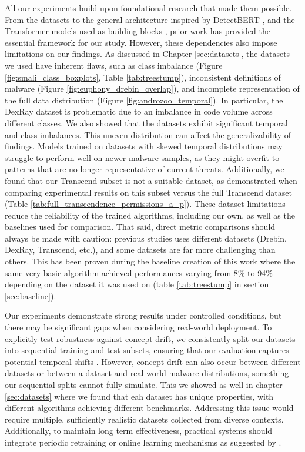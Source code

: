 All our experiments build upon foundational research that made them possible.
From the datasets \cite{drebin, transcend, dexray} to the general architecture inspired by 
DetectBERT \cite{detectbert}, and the Transformer models used as building blocks 
\cite{modernbert, bigbird, longformer}, prior work has provided the essential framework for our study.
However, these dependencies also impose limitations on our findings.
As discussed in Chapter \ref{sec:datasets}, the datasets we used have inherent flaws, 
such as class imbalance (Figure \ref{fig:smali_class_boxplots}, Table \ref{tab:treestump}), 
inconsistent definitions of malware (Figure \ref{fig:euphony_drebin_overlap}), 
and incomplete representation of the full data distribution (Figure \ref{fig:androzoo_temporal}).
In particular, the DexRay dataset \cite{dexray} is problematic due to an imbalance in code volume across different classes.
We also showed that the datasets exhibit significant temporal and class imbalances. 
This uneven distribution can affect the generalizability of findings. 
Models trained on datasets with skewed temporal distributions may struggle to perform well on newer malware samples, 
as they might overfit to patterns that are no longer representative of current threats. 
Additionally, we found that our Transcend subset is not a suitable dataset, 
as demonstrated when comparing experimental results on this subset versus the full Transcend dataset (Table \ref{tab:full_transcendence_permissions_a_p}).
These dataset limitations reduce the reliability of the trained algorithms, 
including our own, as well as the baselines used for comparison.
That said, direct metric comparisons should always be made with caution: 
previous studies uses different datasets (Drebin, DexRay, Transcend, etc.), and some datasets 
are far more challenging than others. This has been proven during the baseline creation of this work where
the same very basic algorithm achieved performances varying from 8\% to 94\% depending on the dataset it was used on
(table \ref{tab:treestump} in section \ref{sec:baseline}). 

Our experiments demonstrate strong results under controlled conditions, 
but there may be significant gaps when considering real-world deployment.
To explicitly test robustness against concept drift, 
we consistently split our datasets into sequential training and test subsets, 
ensuring that our evaluation captures potential temporal shifts \cite{tesseract}.
However, concept drift can also occur between different datasets or between a dataset and real world 
malware distributions, something our sequential splits cannot fully simulate.
This we showed as well in chapter \ref{sec:datasets} where we found that eah dataset has unique properties, 
with different algorithms achieving different benchmarks.
Addressing this issue would require multiple, sufficiently realistic datasets collected from diverse contexts.
Additionally, to maintain long term effectiveness, practical systems should integrate periodic 
retraining or online learning mechanisms as suggested by \cite{tesseract}.

